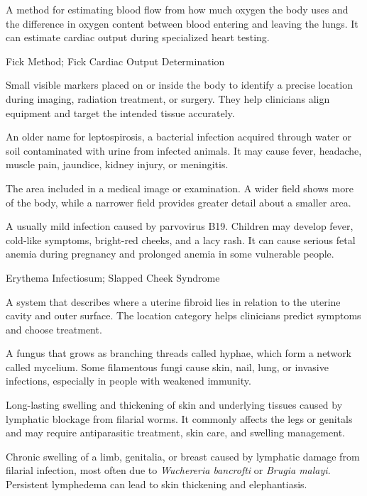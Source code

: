  A method for estimating blood flow from how much oxygen the body uses and the difference in oxygen content between blood entering and leaving the lungs. It can estimate cardiac output during specialized heart testing.

\synonyms
Fick Method; Fick Cardiac Output Determination

 Small visible markers placed on or inside the body to identify a precise location during imaging, radiation treatment, or surgery. They help clinicians align equipment and target the intended tissue accurately.

 An older name for leptospirosis, a bacterial infection acquired through water or soil contaminated with urine from infected animals. It may cause fever, headache, muscle pain, jaundice, kidney injury, or meningitis.

 The area included in a medical image or examination. A wider field shows more of the body, while a narrower field provides greater detail about a smaller area.

 A usually mild infection caused by parvovirus B19. Children may develop fever, cold-like symptoms, bright-red cheeks, and a lacy rash. It can cause serious fetal anemia during pregnancy and prolonged anemia in some vulnerable people.

\synonyms
Erythema Infectiosum; Slapped Cheek Syndrome

 A system that describes where a uterine fibroid lies in relation to the uterine cavity and outer surface. The location category helps clinicians predict symptoms and choose treatment.

 A fungus that grows as branching threads called hyphae, which form a network called mycelium. Some filamentous fungi cause skin, nail, lung, or invasive infections, especially in people with weakened immunity.

 Long-lasting swelling and thickening of skin and underlying tissues caused by lymphatic blockage from filarial worms. It commonly affects the legs or genitals and may require antiparasitic treatment, skin care, and swelling management.

 Chronic swelling of a limb, genitalia, or breast caused by lymphatic damage from filarial infection, most often due to \textit{Wuchereria bancrofti} or \textit{Brugia malayi}. Persistent lymphedema can lead to skin thickening and elephantiasis.


